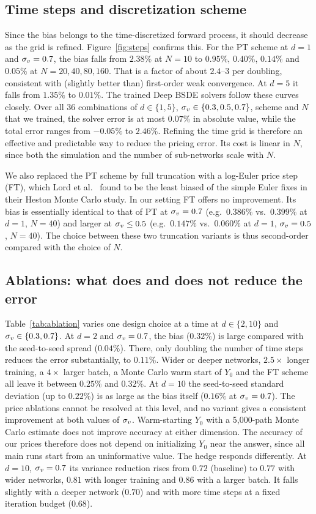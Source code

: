 \subsection{Time steps and discretization scheme}\label{sec:steps}
Since the bias belongs to the time-discretized forward process, it should decrease as the grid is refined. Figure~\ref{fig:steps} confirms this. For the PT scheme at $d=1$ and $\sigma_v=0.7$, the bias falls from $2.38\%$ at $N=10$ to $0.95\%$, $0.40\%$, $0.14\%$ and $0.05\%$ at $N=20,40,80,160$. That is a factor of about $2.4$--$3$ per doubling, consistent with (slightly better than) first-order weak convergence. At $d=5$ it falls from $1.35\%$ to $0.01\%$. The trained Deep BSDE solvers follow these curves closely. Over all $36$ combinations of $d\in\{1,5\}$, $\sigma_v\in\{0.3,0.5,0.7\}$, scheme and $N$ that we trained, the solver error is at most $0.07\%$ in absolute value, while the total error ranges from $-0.05\%$ to $2.46\%$. Refining the time grid is therefore an effective and predictable way to reduce the pricing error. Its cost is linear in $N$, since both the simulation and the number of sub-networks scale with $N$.

We also replaced the PT scheme by full truncation with a log-Euler price step (FT), which Lord et al.~\cite{lord2010comparison} found to be the least biased of the simple Euler fixes in their Heston Monte Carlo study. In our setting FT offers no improvement. Its bias is essentially identical to that of PT at $\sigma_v=0.7$ (e.g.\ $0.386\%$ vs.\ $0.399\%$ at $d=1$, $N=40$) and larger at $\sigma_v\le0.5$ (e.g.\ $0.147\%$ vs.\ $0.060\%$ at $d=1$, $\sigma_v=0.5$, $N=40$). The choice between these two truncation variants is thus second-order compared with the choice of $N$.


\subsection{Ablations: what does and does not reduce the error}\label{sec:ablation}
Table~\ref{tab:ablation} varies one design choice at a time at $d\in\{2,10\}$ and $\sigma_v\in\{0.3,0.7\}$. At $d=2$ and $\sigma_v=0.7$, the bias ($0.32\%$) is large compared with the seed-to-seed spread ($0.04\%$). There, only doubling the number of time steps reduces the error substantially, to $0.11\%$. Wider or deeper networks, $2.5\times$ longer training, a $4\times$ larger batch, a Monte Carlo warm start of $Y_0$ and the FT scheme all leave it between $0.25\%$ and $0.32\%$. At $d=10$ the seed-to-seed standard deviation (up to $0.22\%$) is as large as the bias itself ($0.16\%$ at $\sigma_v=0.7$). The price ablations cannot be resolved at this level, and no variant gives a consistent improvement at both values of $\sigma_v$. Warm-starting $Y_0$ with a 5{,}000-path Monte Carlo estimate does not improve accuracy at either dimension. The accuracy of our prices therefore does not depend on initializing $Y_0$ near the answer, since all main runs start from an uninformative value. The hedge responds differently. At $d=10$, $\sigma_v=0.7$ its variance reduction rises from $0.72$ (baseline) to $0.77$ with wider networks, $0.81$ with longer training and $0.86$ with a larger batch. It falls slightly with a deeper network ($0.70$) and with more time steps at a fixed iteration budget ($0.68$).

